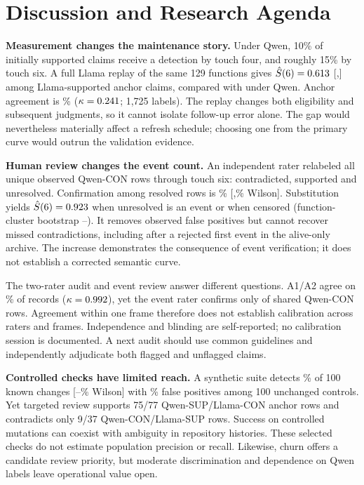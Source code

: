 \section{Discussion and Research Agenda}\label{sec:discussion}

\textbf{Measurement changes the maintenance story.} Under Qwen, 10\% of initially supported claims receive a detection by touch four, and roughly 15\% by touch six. A full Llama replay of the same 129 functions gives $\hat S(6)=0.613$ [\XLlamaFullSsixLo,\XLlamaFullSsixHi] among \XLlamaFullN{} Llama-supported anchor claims, compared with \XMainN{} under Qwen. Anchor agreement is \XLlamaAnchorAgree\% ($\kappa=0.241$; 1,725 labels). The replay changes both eligibility and subsequent judgments, so it cannot isolate follow-up error alone. The gap would nevertheless materially affect a refresh schedule; choosing one from the primary curve would outrun the validation evidence.

\textbf{Human review changes the event count.} An independent rater relabeled all \XHumanEventAuditN{} unique observed Qwen-CON rows through touch six: \XHumanLabelConN{} contradicted, \XHumanLabelSupN{} supported and \XHumanLabelUnrN{} unresolved. Confirmation among resolved rows is \XHumanPpv\% [\XHumanPpvLo,\XHumanPpvHi\% Wilson]. Substitution yields $\hat S(6)=0.923$ when unresolved is an event or \XHumanLabelSsixHi{} when censored (function-cluster bootstrap \XHumanSsixBootLo--\XHumanSsixBootHi). It removes observed false positives but cannot recover missed contradictions, including after a rejected first event in the alive-only archive. The increase demonstrates the consequence of event verification; it does not establish a corrected semantic curve.

The two-rater audit and event review answer different questions. A1/A2 agree on \XTwoRaterAgree\% of \XTwoRaterN{} records ($\kappa=0.992$), yet the event rater confirms only \XHumanOverlapCon{} of \XHumanOverlapN{} shared Qwen-CON rows. Agreement within one frame therefore does not establish calibration across raters and frames. Independence and blinding are self-reported; no calibration session is documented. A next audit should use common guidelines and independently adjudicate both flagged and unflagged claims.

\textbf{Controlled checks have limited reach.} A synthetic suite detects \XMutationRecallPct\% of 100 known changes [\XMutationRecallLo--\XMutationRecallHi\% Wilson] with \XMutationFprPct\% false positives among 100 unchanged controls. Yet targeted review supports 75/77 Qwen-SUP/Llama-CON anchor rows and contradicts only 9/37 Qwen-CON/Llama-SUP rows. Success on controlled mutations can coexist with ambiguity in repository histories. These selected checks do not estimate population precision or recall. Likewise, churn offers a candidate review priority, but moderate discrimination and dependence on Qwen labels leave operational value open.

